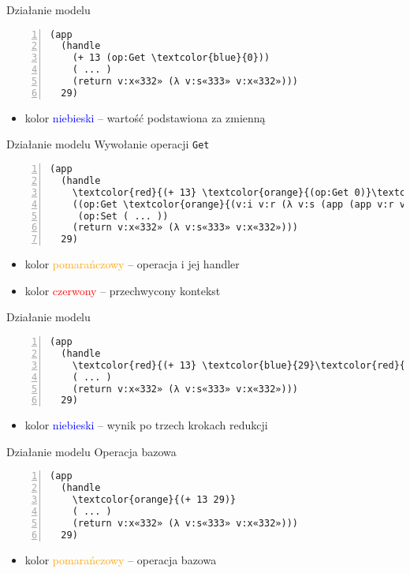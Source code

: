\documentclass{beamer}
\begin{document}
\begin{frame}[fragile]{Działanie modelu}
\begin{Verbatim}[commandchars=\\\{\},numbers=left]
(app
  (handle
    (+ 13 (op:Get \textcolor{blue}{0}))
    ( ... )
    (return v:x«332» (λ v:s«333» v:x«332»)))
  29)
\end{Verbatim}
\begin{itemize}
  \item kolor \textcolor{blue}{niebieski} -- wartość podstawiona za zmienną
\end{itemize}
\end{frame}

\begin{frame}[fragile]{Działanie modelu}
Wywołanie operacji \texttt{Get}
\begin{Verbatim}[commandchars=\\\{\},numbers=left]
(app
  (handle
    \textcolor{red}{(+ 13} \textcolor{orange}{(op:Get 0)}\textcolor{red}{)}
    ((op:Get \textcolor{orange}{(v:i v:r (λ v:s (app (app v:r v:s) v:s)))})
     (op:Set ( ... ))
    (return v:x«332» (λ v:s«333» v:x«332»)))
  29)
\end{Verbatim}
\begin{itemize}
  \item kolor \textcolor{orange}{pomarańczowy} -- operacja i jej handler
  \item kolor \textcolor{red}{czerwony} -- przechwycony kontekst
\end{itemize}
\end{frame}

\begin{frame}[fragile]{Działanie modelu}
\begin{Verbatim}[commandchars=\\\{\},numbers=left]
(app
  (handle
    \textcolor{red}{(+ 13} \textcolor{blue}{29}\textcolor{red}{)}
    ( ... )
    (return v:x«332» (λ v:s«333» v:x«332»)))
  29)
\end{Verbatim}
\begin{itemize}
  \item kolor \textcolor{blue}{niebieski} -- wynik po trzech krokach redukcji
\end{itemize}
\end{frame}

\begin{frame}[fragile]{Działanie modelu}
Operacja bazowa
\begin{Verbatim}[commandchars=\\\{\},numbers=left]
(app
  (handle
    \textcolor{orange}{(+ 13 29)}
    ( ... )
    (return v:x«332» (λ v:s«333» v:x«332»)))
  29)
\end{Verbatim}
\begin{itemize}
  \item kolor \textcolor{orange}{pomarańczowy} -- operacja bazowa
\end{itemize}
\end{frame}
\end{document}
